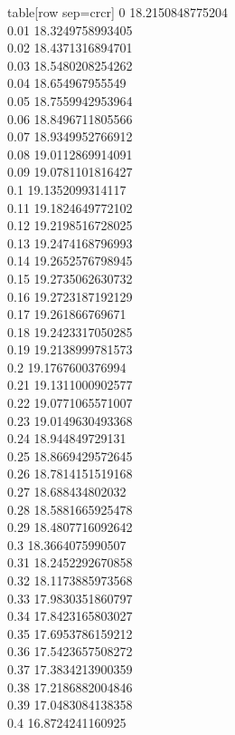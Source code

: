   table[row sep=crcr]{%
0	18.2150848775204\\
0.01	18.3249758993405\\
0.02	18.4371316894701\\
0.03	18.5480208254262\\
0.04	18.654967955549\\
0.05	18.7559942953964\\
0.06	18.8496711805566\\
0.07	18.9349952766912\\
0.08	19.0112869914091\\
0.09	19.0781101816427\\
0.1	19.1352099314117\\
0.11	19.1824649772102\\
0.12	19.2198516728025\\
0.13	19.2474168796993\\
0.14	19.2652576798945\\
0.15	19.2735062630732\\
0.16	19.2723187192129\\
0.17	19.261866769671\\
0.18	19.2423317050285\\
0.19	19.2138999781573\\
0.2	19.1767600376994\\
0.21	19.1311000902577\\
0.22	19.0771065571007\\
0.23	19.0149630493368\\
0.24	18.944849729131\\
0.25	18.8669429572645\\
0.26	18.7814151519168\\
0.27	18.688434802032\\
0.28	18.5881665925478\\
0.29	18.4807716092642\\
0.3	18.3664075990507\\
0.31	18.2452292670858\\
0.32	18.1173885973568\\
0.33	17.9830351860797\\
0.34	17.8423165803027\\
0.35	17.6953786159212\\
0.36	17.5423657508272\\
0.37	17.3834213900359\\
0.38	17.2186882004846\\
0.39	17.0483084138358\\
0.4	16.8724241160925\\
}
